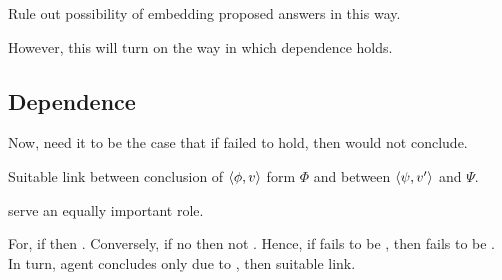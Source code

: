 \begin{note}
  Rule out possibility of embedding proposed answers in this way.

  However, this will turn on the way in which dependence holds.
\end{note}

\subsection{Dependence}

\begin{note}
  Now, need it to be the case that if \ros{} failed to hold, then would not conclude.

  Suitable link between conclusion of \(\langle \phi, v \rangle\) form \(\Phi\) and \ros{} between \(\langle \psi, v' \rangle\) and \(\Psi\).

   serve an equally important role.

  For, if \fc{} then \ros{}.
  Conversely, if no \ros{} then not \fc{}.
  Hence, if fails to be \ros{}, then fails to be \fc{}.
  In turn, agent concludes only due to \fc{}, then suitable link.
\end{note}

